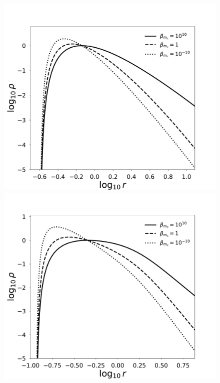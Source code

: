 \documentclass[twocolumn,aps,showpacs,showkeys,prd,superscriptaddress,byrevtex, amsmath]{revtex4-1}
\begin{document}
\begin{figure}
\centering
\includegraphics[scale=0.22]{figures/radial_log_rho_model_I.pdf}
\hspace{-0.6cm}
\includegraphics[scale=0.22]{figures/radial_log_rho_model_IV.pdf}
\hspace{-0.6cm}

\end{figure}
\end{document}
